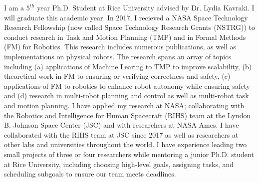 
\small{I am a $5^{th}$ year Ph.D. Student at Rice University advised by Dr. Lydia Kavraki. I will graduate this academic year. In 2017, I recieved a NASA Space Technology Research Fellowship (now called Space Technology Research Grants (NSTRG)) to conduct research in Task and Motion Planning (TMP) and in Formal Methods (FM) for Robotics. This research includes numerous publications, as well as implementations on physical robots. The research spans an array of topics including (a) applications of Machine Learing to TMP to improve scalability, (b) theoretical work in FM to ensuring or verifying correctness and safety, (c) applications of FM to robotics to enhance robot autonomy while ensuring safety and (d) research in multi-robot planning and control as well as multi-robot task and motion planning. I have applied my research at NASA; collaborating with the Robotics and Intelligence for Human Spacecraft (RIHS) team at the Lyndon B. Johnson Space Center (JSC) and with researchers at NASA Ames. I have collaborated with the RIHS team at JSC since 2017 as well as researchers at other labs and universities throughout the world. I have experience leading two small projects of three or four researchers while mentoring a junior Ph.D. student at Rice University, including choosing high-level goals, assigning tasks, and scheduling subgoals to ensure our team meets deadlines.}
